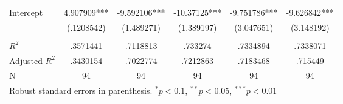 \documentclass[a4paper]{article}
\theoremstyle{plain}
\theoremstyle{definition}
\begin{document}
\begin{table}[htbp]
\begin{tabular}{l*{5}{c}}
                \\
Intercept          &    4.907909***&   -9.592106***&   -10.37125***&   -9.751786***&   -9.626842***\\
                &  (.1208542)   &  (1.489271)   &  (1.389197)   &  (3.047651)   &  (3.148192)   \\
\\
\hline 
$R^2$               &    .3571441   &    .7118813   &     .733274   &    .7334894   &    .7338071   \\
Adjusted $R^2$     &    .3430154   &    .7022774   &    .7212863   &    .7183468   &     .715449   \\
N               &          94   &          94   &          94   &          94   &          94   \\
\hline\hline 
\multicolumn{6}{l}{\small Robust standard errors in parenthesis. $^{*} p<0.1$, $^{**} p < 0.05$, $^{***} p < 0.01$} 
\end{tabular}   
\end{table}
\end{document}

